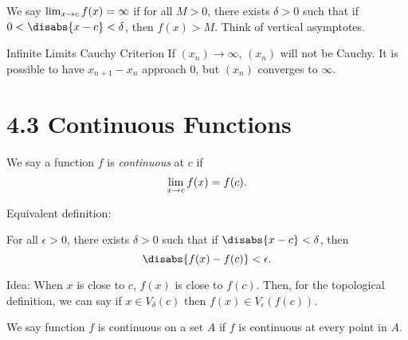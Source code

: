 We say \(\lim_{x \rightarrow c}f(x) = \infty\) if for all \(M > 0\), there exists \(\delta > 0\) such that if \(0 < \disabs{x - c} < \delta\), then \(f(x) > M\). Think of vertical asymptotes.


\begin{ntheorem}
    {Infinite Limits Cauchy Criterion} If \((x_n) \rightarrow \infty\), \((x_n)\) will not be Cauchy. It is possible to have \(x_{n+1} - x_n\) approach 0, but \((x_n)\) converges to \(\infty\).
\end{ntheorem}

\section{4.3 Continuous Functions}

\begin{definition}
    We say a function \(f\) is \textit{continuous} at \(c\) if
    \[
        \lim_{x \rightarrow c}f(x) = f(c).
    \]

    Equivalent definition:

    For all \(\epsilon > 0\), there exists \(\delta > 0\) such that if \(\disabs{x - c} < \delta\), then
    \[
        \disabs{f(x) - f(c)} < \epsilon.
    \]
\end{definition}

Idea: When \(x\) is close to \(c\), \(f(x)\) is close to \(f(c)\). Then, for the topological definition, we can say if \(x \in V_\delta(c)\) then \(f(x) \in V_\epsilon(f(c))\).

\begin{definition}
    We say function \(f\) is continuous on a set \(A\) if \(f\) is continuous at every point in \(A\). 
\end{definition}
